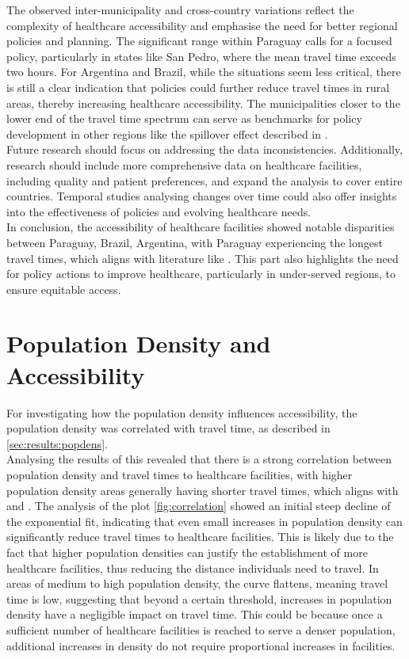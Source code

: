 \documentclass[11pt, a4paper]{report}
\begin{document}
The observed inter-municipality and cross-country variations reflect the complexity of healthcare accessibility and emphasise the need for better regional policies and planning. The significant range within Paraguay calls for a focused policy, particularly in states like San Pedro, where the mean travel time exceeds two hours. For Argentina and Brazil, while the situations seem less critical, there is still a clear indication that policies could further reduce travel times in rural areas, thereby increasing healthcare accessibility. The municipalities closer to the lower end of the travel time spectrum can serve as benchmarks for policy development in other regions like the spillover effect described in \citet{piquer-rodriguez_land_2021}. \\
%
Future research should focus on addressing the data inconsistencies. Additionally, research should include more comprehensive data on healthcare facilities, including quality and patient preferences, and expand the analysis to cover entire countries. Temporal studies analysing changes over time could also offer insights into the effectiveness of policies and evolving healthcare needs. \\
%
In conclusion, the accessibility of healthcare facilities showed notable disparities between Paraguay, Brazil, Argentina, with Paraguay experiencing the longest travel times, which aligns with literature like \citet{gbd_2016_healthcare_access_and_quality_collaborators_measuring_2018}. This part also highlights the need for policy actions to improve healthcare, particularly in under-served regions, to ensure equitable access.

\section{Population Density and Accessibility}

For investigating how the population density influences accessibility, the population density was correlated with travel time, as described in \ref{sec:results:popdens}. \\
%
Analysing the results of this revealed that there is a strong correlation between population density and travel times to healthcare facilities, with higher population density areas generally having shorter travel times, which aligns with \citet{obubu_evaluation_2023} and \citet{shi_revealing_2020}. The analysis of the plot \ref{fig:correlation} showed an initial steep decline of the exponential fit, indicating that even small increases in population density can significantly reduce travel times to healthcare facilities. This is likely due to the fact that higher population densities can justify the establishment of more healthcare facilities, thus reducing the distance individuals need to travel.
In areas of medium to high population density, the curve flattens, meaning travel time is low, suggesting that beyond a certain threshold, increases in population density have a negligible impact on travel time. This could be because once a sufficient number of healthcare facilities is reached to serve a denser population, additional increases in density do not require proportional increases in facilities.
\end{document}
